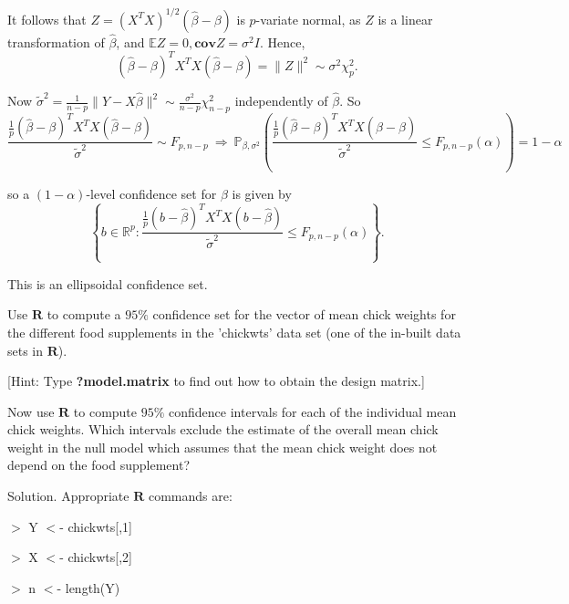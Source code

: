 It follows that $Z=(X^TX)^{1/2}(\hat{\beta}-\beta)$ is $p$-variate normal, as $Z$ is a linear transformation of $\hat{\beta}$, and $\mathbb{E}Z=0,\mathbf{cov}Z=\sigma^2I$. Hence,
\begin{equation}
\left(\hat{\beta}-\beta\right)^TX^TX\left(\hat{\beta}-\beta\right) = \|Z\|^2\sim\sigma^2\chi_p^2.
\end{equation}

Now $\tilde{\sigma}^2=\frac{1}{n-p}\|Y-X\hat{\beta}\|^2 \sim \frac{\sigma^2}{n-p}\chi_{n-p}^2$ independently of $\hat{\beta}$. So
\begin{equation}
\frac{\frac{1}{p}\left(\hat{\beta}-\beta\right)^TX^TX\left(\hat{\beta}-\beta\right)}{\tilde{\sigma}^2}\sim F_{p,n-p} \ \Rightarrow \ \mathbb{P}_{\beta,\sigma^2}\left(\frac{\frac{1}{p}\left(\hat{\beta}-\beta\right)^TX^TX\left(\hat{\beta}-\beta\right)}{\tilde{\sigma}^2}\leq F_{p,n-p}(\alpha)\right) = 1-\alpha
\end{equation}

so a $(1-\alpha)$-level confidence set for $\beta$ is given by
\begin{equation}
\left\{b\in\mathbb{R}^p: \frac{\frac{1}{p}\left(b-\hat{\beta}\right)^TX^TX\left(b-\hat{\beta}\right)}{\tilde{\sigma}^2}\leq F_{p,n-p}(\alpha)\right\}.
\end{equation}

This is an ellipsoidal confidence set.





\item Use $\mathbf{R}$ to compute a $95\%$ confidence set for the vector of mean chick weights for the different food supplements in the 'chickwts' data set (one of the in-built data sets in $\mathbf{R}$).

[Hint: Type {\bf ?model.matrix} to find out how to obtain the design matrix.]

Now use $\mathbf{R}$ to compute $95\%$ confidence intervals for each of the individual mean chick weights. Which intervals exclude the estimate of the overall mean chick weight in the null model which assumes that the mean chick weight does not depend on the food supplement?



Solution. Appropriate $\mathbf{R}$ commands are:

$>$ Y $<$- chickwts[,1]

$>$ X $<$- chickwts[,2]

$>$ n $<$- length(Y)

